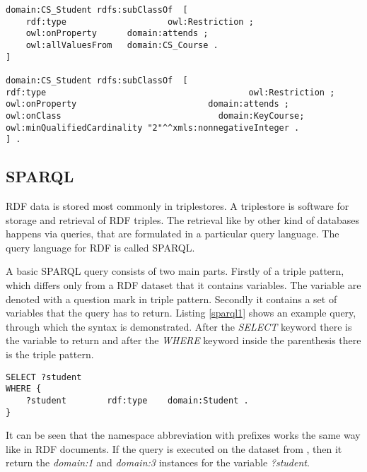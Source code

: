\begin{lstlisting}[basicstyle=\footnotesize, captionpos=b, caption=Restrictions defined as blank nodes, label=lst:sparql, belowskip=1em, aboveskip=2em,
frame=single]
domain:CS_Student rdfs:subClassOf  [ 
	rdf:type					owl:Restriction ; 
	owl:onProperty		domain:attends ; 
	owl:allValuesFrom	domain:CS_Course .
]

domain:CS_Student rdfs:subClassOf  [
rdf:type										owl:Restriction ; 
owl:onProperty							domain:attends ; 
owl:onClass								  domain:KeyCourse; 
owl:minQualifiedCardinality "2"^^xmls:nonnegativeInteger .
] .
\end{lstlisting}


\subsection{SPARQL}


RDF data is stored most commonly in triplestores. A triplestore is software for storage and retrieval of RDF triples. The retrieval like by other kind of databases happens via queries, that are formulated in a particular query language. The query language for RDF is called SPARQL. 

A basic SPARQL query consists of two main parts. Firstly of a triple pattern, which differs only from a RDF dataset that it contains variables. The variable are denoted with a question mark in triple pattern. Secondly it contains a set of variables that the query has to return. Listing \ref{sparql1} shows an example query, through which the syntax is demonstrated. After the \textit{SELECT} keyword there is the variable to return and after the \textit{WHERE} keyword inside the parenthesis there is the triple pattern.

\begin{lstlisting}[captionpos=b, caption=SPARQL Query I., label=sparql1, belowskip=1em, aboveskip=2em, 
basicstyle=\footnotesize,frame=single]
SELECT ?student  
WHERE { 
	?student		rdf:type	domain:Student .	
}
\end{lstlisting}


It can be seen that the namespace abbreviation with prefixes works the same way like in RDF documents. If the query is executed on the dataset from , then it return the \textit{domain:1} and \textit{domain:3} instances for the variable \textit{?student}. 






